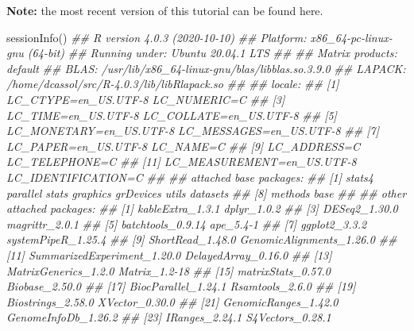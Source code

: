 \documentclass[14pt,]{article}
\newcommand{\hlcom}[1]{\textcolor[rgb]{0.502,0.502,0.502}{\textit{#1}}}%
\newcommand{\hlstd}[1]{\textcolor[rgb]{0.251,0.251,0.251}{#1}}%
\newenvironment{Shaded}{\begin{myshaded}}{\end{myshaded}}
\newcommand{\DocumentationTok}[1]{\hlcom{#1}}
\newcommand{\FunctionTok}[1]{\hlstd{#1}}
\newcommand{\NormalTok}[1]{\hlstd{#1}}
\begin{document}
\textbf{Note:} the most recent version of this tutorial can be found here.

\begin{Shaded}
\begin{Highlighting}[]
\FunctionTok{sessionInfo}\NormalTok{()}
\DocumentationTok{\#\# R version 4.0.3 (2020{-}10{-}10)}
\DocumentationTok{\#\# Platform: x86\_64{-}pc{-}linux{-}gnu (64{-}bit)}
\DocumentationTok{\#\# Running under: Ubuntu 20.04.1 LTS}
\DocumentationTok{\#\# }
\DocumentationTok{\#\# Matrix products: default}
\DocumentationTok{\#\# BLAS:   /usr/lib/x86\_64{-}linux{-}gnu/blas/libblas.so.3.9.0}
\DocumentationTok{\#\# LAPACK: /home/dcassol/src/R{-}4.0.3/lib/libRlapack.so}
\DocumentationTok{\#\# }
\DocumentationTok{\#\# locale:}
\DocumentationTok{\#\#  [1] LC\_CTYPE=en\_US.UTF{-}8       LC\_NUMERIC=C              }
\DocumentationTok{\#\#  [3] LC\_TIME=en\_US.UTF{-}8        LC\_COLLATE=en\_US.UTF{-}8    }
\DocumentationTok{\#\#  [5] LC\_MONETARY=en\_US.UTF{-}8    LC\_MESSAGES=en\_US.UTF{-}8   }
\DocumentationTok{\#\#  [7] LC\_PAPER=en\_US.UTF{-}8       LC\_NAME=C                 }
\DocumentationTok{\#\#  [9] LC\_ADDRESS=C               LC\_TELEPHONE=C            }
\DocumentationTok{\#\# [11] LC\_MEASUREMENT=en\_US.UTF{-}8 LC\_IDENTIFICATION=C       }
\DocumentationTok{\#\# }
\DocumentationTok{\#\# attached base packages:}
\DocumentationTok{\#\# [1] stats4    parallel  stats     graphics  grDevices utils     datasets }
\DocumentationTok{\#\# [8] methods   base     }
\DocumentationTok{\#\# }
\DocumentationTok{\#\# other attached packages:}
\DocumentationTok{\#\#  [1] kableExtra\_1.3.1            dplyr\_1.0.2                }
\DocumentationTok{\#\#  [3] DESeq2\_1.30.0               magrittr\_2.0.1             }
\DocumentationTok{\#\#  [5] batchtools\_0.9.14           ape\_5.4{-}1                  }
\DocumentationTok{\#\#  [7] ggplot2\_3.3.2               systemPipeR\_1.25.4         }
\DocumentationTok{\#\#  [9] ShortRead\_1.48.0            GenomicAlignments\_1.26.0   }
\DocumentationTok{\#\# [11] SummarizedExperiment\_1.20.0 DelayedArray\_0.16.0        }
\DocumentationTok{\#\# [13] MatrixGenerics\_1.2.0        Matrix\_1.2{-}18              }
\DocumentationTok{\#\# [15] matrixStats\_0.57.0          Biobase\_2.50.0             }
\DocumentationTok{\#\# [17] BiocParallel\_1.24.1         Rsamtools\_2.6.0            }
\DocumentationTok{\#\# [19] Biostrings\_2.58.0           XVector\_0.30.0             }
\DocumentationTok{\#\# [21] GenomicRanges\_1.42.0        GenomeInfoDb\_1.26.2        }
\DocumentationTok{\#\# [23] IRanges\_2.24.1              S4Vectors\_0.28.1           }

\end{Highlighting}
\end{Shaded}
\end{document}
